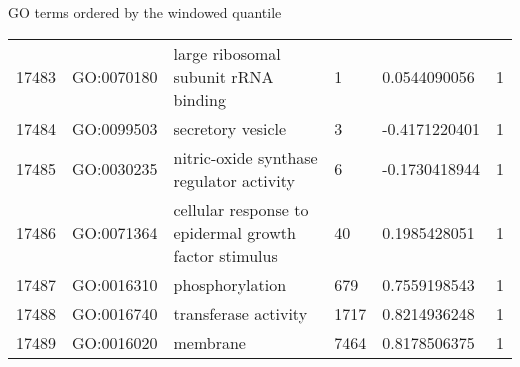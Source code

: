 \documentclass[onepage]{beamer}
\begin{document}
\begin{frame}[t]{GO terms ordered by the windowed quantile}{}
\begin{table}[]
{\begin{tabular}{rlllll}
		17483 & GO:0070180 & large ribosomal subunit rRNA binding                  & 1    & 0.0544090056     & 1            \\
		17484 & GO:0099503 & secretory vesicle                                     & 3    & -0.4171220401    & 1            \\
		17485 & GO:0030235 & nitric-oxide synthase regulator activity              & 6    & -0.1730418944    & 1            \\
		17486 & GO:0071364 & cellular response to epidermal growth factor stimulus & 40   & 0.1985428051     & 1            \\
		17487 & GO:0016310 & phosphorylation                                       & 679  & 0.7559198543     & 1            \\
		17488 & GO:0016740 & transferase activity                                  & 1717 & 0.8214936248     & 1            \\
		17489 & GO:0016020 & membrane                                              & 7464 & 0.8178506375     & 1           
		\end{tabular}
		}
	\end{table}
\end{frame}

\end{document}
